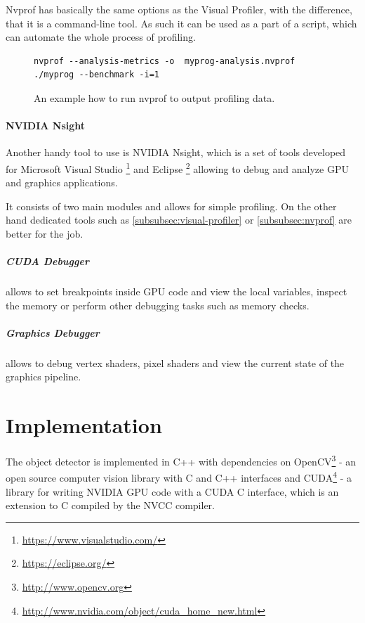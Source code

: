 Nvprof has basically the same options as the Visual Profiler, with the difference, that it is a command-line tool. As such it can be used as a part of a script, which can automate the whole process of profiling.

\begin{figure}
\begin{verbatim}
nvprof --analysis-metrics -o  myprog-analysis.nvprof ./myprog --benchmark -i=1
\end{verbatim}
\caption{An example how to run nvprof to output profiling data.}
\end{figure}

\subsubsection{NVIDIA Nsight}

Another handy tool to use is NVIDIA Nsight, which is a set of tools developed for Microsoft Visual Studio \footnote{\url{https://www.visualstudio.com/}} and Eclipse \footnote{\url{https://eclipse.org/}} allowing to debug and analyze GPU and graphics applications.

It consists of two main modules and allows for simple profiling. On the other hand dedicated tools such as \ref{subsubsec:visual-profiler} or \ref{subsubsec:nvprof} are better for the job.

\paragraph{CUDA Debugger} allows to set breakpoints inside GPU code and view the local variables, inspect the memory or perform other debugging tasks such as memory checks.

\paragraph{Graphics Debugger} allows to debug vertex shaders, pixel shaders and view the current state of the graphics pipeline.

\chapter{Implementation}\label{ch:implementation}

The object detector is implemented in C++ with dependencies on OpenCV\footnote{\url{http://www.opencv.org}} - an open source computer vision library with C and C++ interfaces and CUDA\footnote{\url{http://www.nvidia.com/object/cuda_home_new.html}} - a library for writing NVIDIA GPU code with a CUDA C interface, which is an extension to C compiled by the NVCC compiler.

